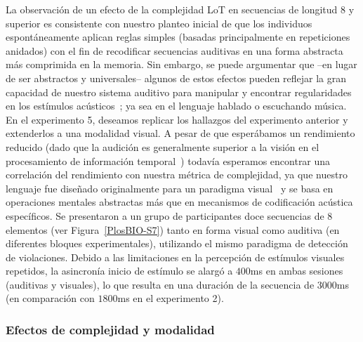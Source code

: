 La observación de un efecto de la complejidad LoT en secuencias de longitud 8 y superior es consistente con nuestro planteo inicial de que los individuos espontáneamente aplican reglas simples (basadas principalmente en repeticiones anidados) con el fin de recodificar secuencias auditivas en una forma abstracta más comprimida en la memoria. Sin embargo, se puede argumentar que --en lugar de ser abstractos y universales-- algunos de estos efectos pueden reflejar la gran capacidad de nuestro sistema auditivo para manipular y encontrar regularidades en los estímulos acústicos~\cite{f90}; ya sea en el lenguaje hablado o escuchando música. En el experimento 5, deseamos replicar los hallazgos del experimento anterior y extenderlos a una modalidad visual. A pesar de que esperábamos un rendimiento reducido (dado que la audición es generalmente superior a la visión en el procesamiento de información temporal~\cite{f91}) todavía esperamos encontrar una correlación del rendimiento con nuestra métrica de complejidad, ya que nuestro lenguaje fue diseñado originalmente para un paradigma visual~\cite{amalric2017language} y se basa en operaciones mentales abstractas más que en mecanismos de codificación acústica específicos. Se presentaron a un grupo de participantes doce secuencias de 8 elementos (ver Figura~\ref{PlosBIO-S7}) tanto en forma visual como auditiva (en diferentes bloques experimentales), utilizando el mismo paradigma de detección de violaciones. Debido a las limitaciones en la percepción de estímulos visuales repetidos, la asincronía inicio de estímulo se alargó a $400$ms en ambas sesiones (auditivas y visuales), lo que resulta en una duración de la secuencia de $3000$ms (en comparación con $1800$ms en el experimento 2).

\subsubsection*{Efectos de complejidad y modalidad}


